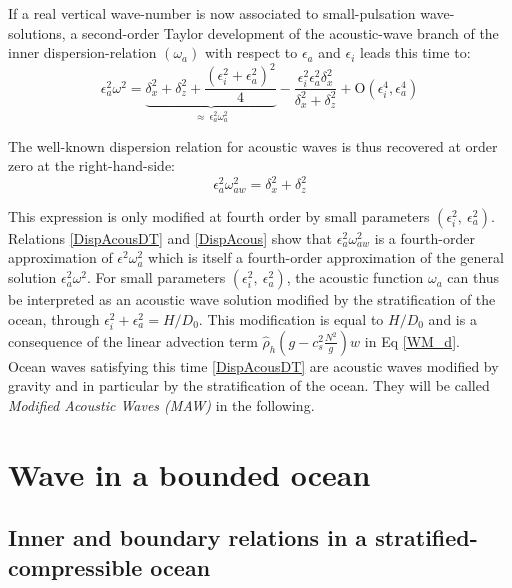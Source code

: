 \documentclass[a4paper,11pt]{article}
\begin{document}
If a real vertical wave-number is now associated to small-pulsation wave-solutions, a second-order Taylor development of the acoustic-wave branch of the inner dispersion-relation $(\omega_a)$  with respect to $\epsilon_a$ and $\epsilon_i$ leads this time to:
\begin{equation}
		\epsilon_a^2\omega^2 =
		\underbrace{\delta_x^2+\delta_z^2
		+\frac{(\epsilon_i^2+\epsilon_a^2)^2}{4}}
		_{\approx\ \epsilon_a^2\omega_a^2}
		-\frac{\epsilon_i^2\epsilon_a^2\delta_x^2}{\delta_x^2+\delta_z^2}
		+\mathrm{O}(\epsilon_i^4,\epsilon_a^4)
		\label{DispAcousDT}
\end{equation}

The well-known dispersion relation for acoustic waves is thus recovered at order zero at the right-hand-side:
\begin{equation}
	\epsilon_a^2\omega_{aw}^2 =\delta_x^2+\delta_z^2
	\label{DispAcous}
\end{equation}

This expression is only modified at fourth order by small parameters $(\epsilon_i^2,\ \epsilon_a^2)$. Relations \ref{DispAcousDT} and \ref{DispAcous} show that $\epsilon_a^2 \omega_{aw}^2$ is a fourth-order approximation of $\epsilon^2 \omega_a^2$ which is itself a fourth-order approximation of the general solution $\epsilon_a^2 \omega^2$.
For small parameters $(\epsilon_i^2,\ \epsilon_a^2)$, the acoustic function $\omega_a$ can thus be interpreted as an acoustic wave solution modified by the stratification of the ocean, through $\epsilon_i^2+\epsilon_a^2=H/D_0$. This modification is equal to $H/D_0$ and is a consequence of the linear advection term $\hat{\rho}_h(g-c_s^2 \frac{N^2}{g})w$ in Eq \ref{WM_d}.\\
Ocean waves satisfying this time \ref{DispAcousDT} are acoustic waves modified by gravity and in particular by the stratification of the ocean. They will be called \textit{Modified Acoustic Waves (MAW)} in the following.

\newpage
\section{Wave in a bounded ocean}
\label{SectionGraphic}

\subsection{Inner and boundary relations in a stratified-compressible ocean}
\label{SubSectionPotBranches}
\end{document}
